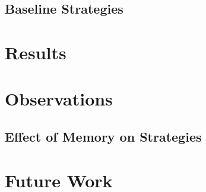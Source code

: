 \documentclass[a4paper]{article}
\begin{document}
	\subsection{Baseline Strategies}

	\section{Results}
	
	\section{Observations}
	
	\subsection{Effect of Memory on Strategies}	
		
	\section{Future Work}
			
\end{document}
